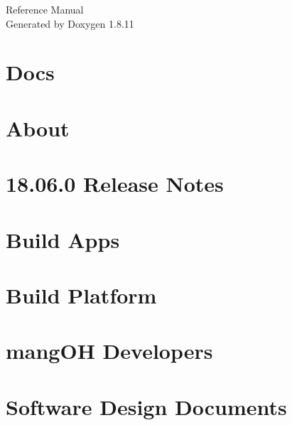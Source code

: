 \documentclass[twoside]{book}
\newcommand{\+}{\discretionary{\mbox{\scriptsize$\hookleftarrow$}}{}{}}
\newcommand{\clearemptydoublepage}{%
  \newpage{\pagestyle{empty}\cleardoublepage}%
}
\begin{document}
\hypersetup{pageanchor=false,
             bookmarksnumbered=true,
             pdfencoding=unicode
            }
\begin{titlepage}
\vspace*{7cm}
\begin{center}%
{\Large Reference Manual}\\
\vspace*{1cm}
{\large Generated by Doxygen 1.8.11}\\
\end{center}
\end{titlepage}
\clearemptydoublepage
\tableofcontents
\clearemptydoublepage
{}
\hypersetup{pageanchor=true}

\chapter{Docs}
\label{index}\hypertarget{index}{}
\chapter{About}
\label{aboutMain}
\hypertarget{aboutMain}{}

\chapter{18.06.0 Release Notes}
\label{releaseNotes18060}
\hypertarget{releaseNotes18060}{}

\chapter{Build Apps}
\label{buildAppsMain}
\hypertarget{buildAppsMain}{}

\chapter{Build Platform}
\label{buildPlatformMain}
\hypertarget{buildPlatformMain}{}

\chapter{mang\+OH Developers}
\label{mangohDevelopers}
\hypertarget{mangohDevelopers}{}

\chapter{Software Design Documents}
\label{c_sdd}
\hypertarget{c_sdd}{}

\end{document}
